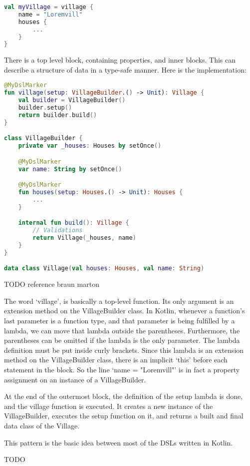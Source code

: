 \begin{lstlisting}[caption={Example DSL usage},language=Kotlin,label=code:pattern_example_usage]
val myVillage = village {
    name = "Loremvill"
    houses {
        ...
    }
}
\end{lstlisting}

There is a top level block, containing properties, and inner blocks. This can describe a structure of data in a type-safe manner. Here is the implementation:

\begin{lstlisting}[caption={Pattern example},language=Kotlin,label=code:pattern_example_impl]
@MyDslMarker
fun village(setup: VillageBuilder.() -> Unit): Village {
    val builder = VillageBuilder()
    builder.setup()
    return builder.build()
}

class VillageBuilder {
    private var _houses: Houses by setOnce()

    @MyDslMarker
    var name: String by setOnce()

    @MyDslMarker
    fun houses(setup: Houses.() -> Unit): Houses {
        ...
    }

    internal fun build(): Village {
        // Validations
        return Village(_houses, name)
    }
}

data class Village(val houses: Houses, val name: String)
\end{lstlisting}

TODO reference braun marton

The word `village', is basically a top-level function. Its only argument is an extension method on the VillageBuilder class. In Kotlin, whenever a function's last parameter is a function type, and that parameter is being fulfilled by a lambda, we can move that lambda outside the parentheses. Furthermore, the parentheses can be omitted if the lambda is the only parameter. The lambda definition must be put inside curly brackets. Since this lambda is an extension method on the VillageBuilder class, there is an implicit `this' before each statement in the block. So the line `name = "Loremvill"' is in fact a property assignment on an instance of a VillageBuilder.

At the end of the outermost block, the definition of the setup lambda is done, and the village function is executed. It creates a new instance of the VillageBuilder, executes the setup function on it, and returns a built and final data class of the Village.

This pattern is the basic idea between most of the DSLs written in Kotlin.

TODO



